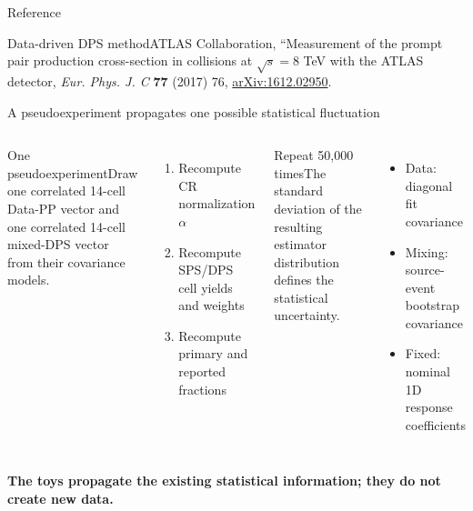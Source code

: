 \documentclass[11pt,aspectratio=169]{beamer}
\begin{document}
\begin{frame}{Reference}
\vspace{.35cm}\begin{block}{Data-driven DPS method}ATLAS Collaboration, ``Measurement of the prompt \Jpsi pair production cross-section in \pp collisions at $\sqrt{s}=8$ TeV with the ATLAS detector, \emph{Eur. Phys. J. C} \textbf{77} (2017) 76, \href{https://arxiv.org/abs/1612.02950}{arXiv:1612.02950}.\end{block}
\vfill\centering{}
\end{frame}

\appendix
\begin{frame}{A pseudoexperiment propagates one possible statistical fluctuation}
\begin{columns}[T]\begin{block}{One pseudoexperiment}Draw one correlated 14-cell Data-PP vector and one correlated 14-cell mixed-DPS vector from their covariance models.\end{block}
\begin{enumerate}\item Recompute CR normalization $\alpha$\item Recompute SPS/DPS cell yields and weights\item Recompute primary and reported fractions\end{enumerate}
\begin{exampleblock}{Repeat 50,000 times}The standard deviation of the resulting estimator distribution defines the statistical uncertainty.\end{exampleblock}
\begin{itemize}\item Data: diagonal fit covariance\item Mixing: source-event bootstrap covariance\item Fixed: nominal 1D response coefficients\end{itemize}\end{columns}
\vfill\centering\textbf{The toys propagate the existing statistical information; they do not create new data.}
\end{frame}
\end{document}
